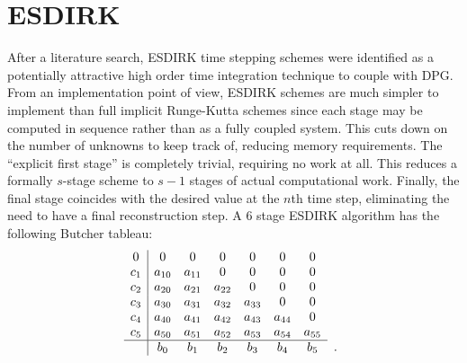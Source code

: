 \documentclass[Proposal.tex]{subfiles}
\begin{document}
%                                                            
%                                                            
%                        
\section{ESDIRK}
After a literature search, ESDIRK time stepping schemes were identified as a potentially attractive high order time integration technique to couple with DPG.
From an implementation point of view, ESDIRK schemes are much simpler to implement than full implicit Runge-Kutta schemes since each stage may be computed in sequence rather than as a fully coupled system. 
This cuts down on the number of unknowns to keep track of, reducing memory requirements.
The ``explicit first stage'' is completely trivial, requiring no work at all. 
This reduces a formally $s$-stage scheme to $s-1$ stages of actual computational work.
Finally, the final stage coincides with the desired value at the $n$th time step, eliminating the need to have a final reconstruction step.
A 6 stage ESDIRK algorithm has the following Butcher tableau:
\[
\begin{array}{c|cccccc}
  0 & 0 & 0 & 0 & 0 & 0 & 0 \\
  c_1 & a_{10} & a_{11} & 0 & 0 & 0 & 0 \\
  c_2 & a_{20} & a_{21} & a_{22} & 0 & 0 & 0 \\
  c_3 & a_{30} & a_{31} & a_{32} & a_{33} & 0 & 0 \\
  c_4 & a_{40} & a_{41} & a_{42} & a_{43} & a_{44} & 0 \\
  c_5 & a_{50} & a_{51} & a_{52} & a_{53} & a_{54} & a_{55} \\
  \hline
   & b_0 & b_1 & b_2 & b_3 & b_4 & b_5 \\
\end{array}
\begin{array}{c}
  \vphantom{} \\
  \vphantom{} \\
  \vphantom{} \\
  \vphantom{} \\
  \vphantom{} \\
  \vphantom{} \\
  . \\
\end{array}
\]
\end{document}
